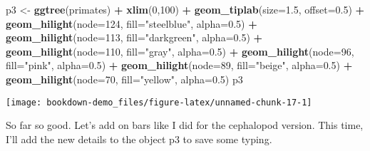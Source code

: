 \documentclass[]{book}
\newenvironment{Shaded}{\begin{snugshade}}{\end{snugshade}}
\newcommand{\KeywordTok}[1]{\textcolor[rgb]{0.13,0.29,0.53}{\textbf{#1}}}
\newcommand{\DataTypeTok}[1]{\textcolor[rgb]{0.13,0.29,0.53}{#1}}
\newcommand{\DecValTok}[1]{\textcolor[rgb]{0.00,0.00,0.81}{#1}}
\newcommand{\FloatTok}[1]{\textcolor[rgb]{0.00,0.00,0.81}{#1}}
\newcommand{\StringTok}[1]{\textcolor[rgb]{0.31,0.60,0.02}{#1}}
\newcommand{\OperatorTok}[1]{\textcolor[rgb]{0.81,0.36,0.00}{\textbf{#1}}}
\newcommand{\NormalTok}[1]{#1}
\begin{document}
\begin{Shaded}
\begin{Highlighting}[]
\NormalTok{p3 <-}\StringTok{ }\KeywordTok{ggtree}\NormalTok{(primates) }\OperatorTok{+}
\StringTok{  }\KeywordTok{xlim}\NormalTok{(}\DecValTok{0}\NormalTok{,}\DecValTok{100}\NormalTok{) }\OperatorTok{+}
\StringTok{  }\KeywordTok{geom_tiplab}\NormalTok{(}\DataTypeTok{size=}\FloatTok{1.5}\NormalTok{, }\DataTypeTok{offset=}\FloatTok{0.5}\NormalTok{) }\OperatorTok{+}
\StringTok{  }\KeywordTok{geom_hilight}\NormalTok{(}\DataTypeTok{node=}\DecValTok{124}\NormalTok{, }\DataTypeTok{fill=}\StringTok{"steelblue"}\NormalTok{, }\DataTypeTok{alpha=}\FloatTok{0.5}\NormalTok{) }\OperatorTok{+}
\StringTok{  }\KeywordTok{geom_hilight}\NormalTok{(}\DataTypeTok{node=}\DecValTok{113}\NormalTok{, }\DataTypeTok{fill=}\StringTok{"darkgreen"}\NormalTok{, }\DataTypeTok{alpha=}\FloatTok{0.5}\NormalTok{) }\OperatorTok{+}
\StringTok{  }\KeywordTok{geom_hilight}\NormalTok{(}\DataTypeTok{node=}\DecValTok{110}\NormalTok{, }\DataTypeTok{fill=}\StringTok{"gray"}\NormalTok{, }\DataTypeTok{alpha=}\FloatTok{0.5}\NormalTok{) }\OperatorTok{+}
\StringTok{  }\KeywordTok{geom_hilight}\NormalTok{(}\DataTypeTok{node=}\DecValTok{96}\NormalTok{, }\DataTypeTok{fill=}\StringTok{"pink"}\NormalTok{, }\DataTypeTok{alpha=}\FloatTok{0.5}\NormalTok{) }\OperatorTok{+}
\StringTok{  }\KeywordTok{geom_hilight}\NormalTok{(}\DataTypeTok{node=}\DecValTok{89}\NormalTok{, }\DataTypeTok{fill=}\StringTok{"beige"}\NormalTok{, }\DataTypeTok{alpha=}\FloatTok{0.5}\NormalTok{) }\OperatorTok{+}
\StringTok{  }\KeywordTok{geom_hilight}\NormalTok{(}\DataTypeTok{node=}\DecValTok{70}\NormalTok{, }\DataTypeTok{fill=}\StringTok{"yellow"}\NormalTok{, }\DataTypeTok{alpha=}\FloatTok{0.5}\NormalTok{) }
\NormalTok{p3}
\end{Highlighting}
\end{Shaded}

\begin{center}\texttt{[image: bookdown-demo\_files/figure-latex/unnamed-chunk-17-1]} \end{center}

So far so good. Let's add on bars like I did for the cephalopod version.
This time, I'll add the new details to the object p3 to save some
typing.
\end{document}
